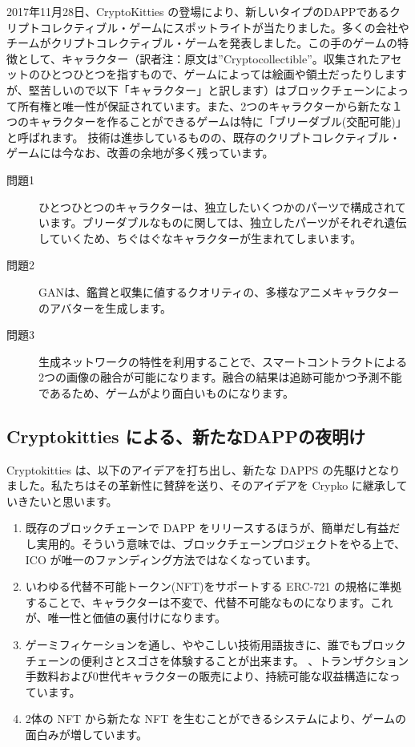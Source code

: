 \documentclass[a4paper]{article}
\begin{document}
2017年11月28日、CryptoKitties\cite{cryptokitties} の登場により、新しいタイプのDAPPであるクリプトコレクティブル・ゲームにスポットライトが当たりました。多くの会社やチームがクリプトコレクティブル・ゲームを発表しました\cite{cryptomons,cryptocountries,cryptopets,cryptoarts,cryptolandmarks,cryptofighters,etheremon,etherwaifu}。この手のゲームの特徴として、キャラクター（訳者注：原文は”Cryptocollectible”。収集されたアセットのひとつひとつを指すもので、ゲームによっては絵画や領土だったりしますが、堅苦しいので以下「キャラクター」と訳します）はブロックチェーンによって所有権と唯一性が保証されています。また、2つのキャラクターから新たな１つのキャラクターを作ることができるゲームは特に「ブリーダブル(交配可能)」と呼ばれます。
技術は進歩しているものの、既存のクリプトコレクティブル・ゲームには今なお、改善の余地が多く残っています。
\begin{description}
\item [問題1\label{problem:1}] ひとつひとつのキャラクターは、独立したいくつかのパーツで構成されています。ブリーダブルなものに関しては、独立したパーツがそれぞれ遺伝していくため、ちぐはぐなキャラクターが生まれてしまいます。
\item [問題2\label{problem:2}] GANは、鑑賞と収集に値するクオリティの、多様なアニメキャラクターのアバターを生成します。
\item [問題3\label{problem:3}] 生成ネットワークの特性を利用することで、スマートコントラクトによる2つの画像の融合が可能になります。融合の結果は追跡可能かつ予測不能であるため、ゲームがより面白いものになります。
\end{description} 

\subsection{Cryptokitties による、新たなDAPPの夜明け}

Cryptokitties は、以下のアイデアを打ち出し、新たな DAPPS の先駆けとなりました。私たちはその革新性に賛辞を送り、そのアイデアを Crypko に継承していきたいと思います。

\begin{enumerate}
\item 既存のブロックチェーンで DAPP をリリースするほうが、簡単だし有益だし実用的。そういう意味では、ブロックチェーンプロジェクトをやる上で、ICO が唯一のファンディング方法ではなくなっています。
\item いわゆる代替不可能トークン(NFT)をサポートする ERC-721 の規格に準拠することで、キャラクターは不変で、代替不可能なものになります。これが、唯一性と価値の裏付けになります。
\item ゲーミフィケーションを通し、ややこしい技術用語抜きに、誰でもブロックチェーンの便利さとスゴさを体験することが出来ます。
、トランザクション手数料および0世代キャラクターの販売により、持続可能な収益構造になっています。
\item 2体の NFT から新たな NFT を生むことができるシステムにより、ゲームの面白みが増しています。
\end{enumerate}
\end{document}
